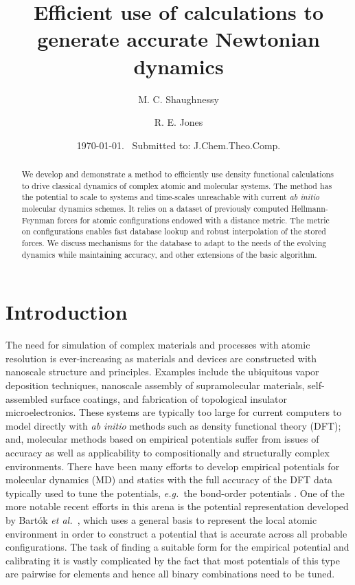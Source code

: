 \documentclass[journal=jctcce,manuscript=article]{achemso}
\title{Efficient use of \abinitio calculations to generate accurate Newtonian dynamics}
\author{M. C. Shaughnessy}
\affiliation{Materials Physics Department, Sandia National Laboratories, Livermore, CA 94550,~USA}
\author{R. E. Jones}\email{rjones@sandia.gov}
\affiliation{Mechanics of Materials Department, Sandia National Laboratories, Livermore, CA 94550,~USA}
\date{\today. \ Submitted to: J.Chem.Theo.Comp.}
\newcommand{\eg}{{\it e.g.\ }}
\newcommand{\etal}{{\it et al.\ }}
\newcommand{\abinitio}{{\it ab initio }}
\begin{document}
\begin{abstract}
We develop and demonstrate a method to efficiently use density functional calculations to drive classical dynamics of complex atomic and molecular systems. 
The method has the potential to scale to systems and time-scales unreachable with current \abinitio molecular dynamics schemes.
It relies on a dataset of previously computed Hellmann-Feynman forces for atomic configurations endowed with a distance metric.
The metric on configurations enables fast database lookup and robust interpolation of the stored forces.
We discuss mechanisms for the database to adapt to the needs of the evolving dynamics while maintaining accuracy, and other extensions of the basic algorithm.
\end{abstract}




\section{Introduction}

The need for simulation of complex materials and processes with atomic resolution is ever-increasing as materials and devices are constructed with nanoscale structure and principles.
Examples include the ubiquitous vapor deposition techniques, nanoscale assembly of supramolecular materials, self-assembled surface coatings, and fabrication of topological insulator microelectronics. 
These systems are typically too large for current computers to model directly with \abinitio methods such as density functional theory (DFT); and, molecular methods based on empirical potentials suffer from issues of accuracy as well as applicability to compositionally and structurally complex environments. 
There have been many efforts to develop empirical potentials for molecular dynamics (MD) and statics with the full accuracy of the DFT data typically used to tune the potentials, \eg the bond-order potentials \cite{Tersoff1988,Tersoff1989,Pettifor1989,Horsfield1996,Brenner2002,Pettifor2004}.
One of the more notable recent efforts in this arena is the potential representation developed by  Bart\'ok \etal \cite{Bartok2010,Bartok_PhysRevB_2013,thompson2014snap}, which uses a general basis to represent the local atomic environment in order to construct a potential that is accurate across all probable configurations.
The task of finding a suitable form for the empirical potential \cite{martin1975many}  and calibrating it is vastly complicated by the fact that most potentials of this type are pairwise for elements and hence all binary combinations need to be tuned.
\end{document}
